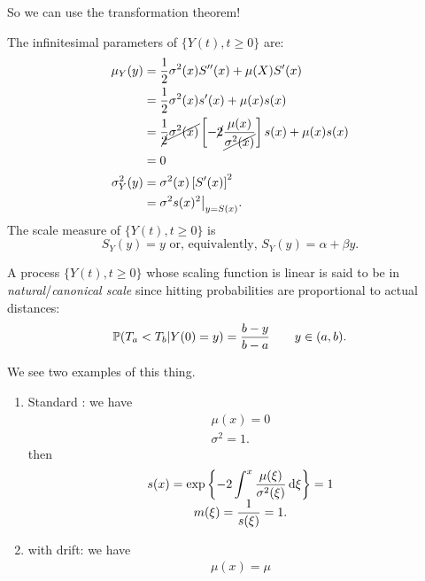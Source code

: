 \documentclass[12pt]{report}
\begin{document}
\begin{enumerate}[\bfseries A:]
\begin{itemize}
		So we can use the transformation theorem!
	\end{itemize}
	The infinitesimal parameters of $\{Y(t),t\geq0\}$ are:
	\begin{align*}
		\mu_{Y}(y)&=\frac{1}{2}\sigma^{2}(x)S''(x)+\mu(X)S'(x)\\
		&=\frac{1}{2}\sigma^{2}(x)s'(x)+\mu(x)s(x)\\
		&=\frac{1}{\cancel{2}}\cancel{\sigma^{2}(x)}\left[-\cancel{2}\frac{\mu(x)}{\cancel{\sigma^{2}(x)}}\right]s(x)+\mu(x)s(x)\\
		&=0\\
		\sigma^{2}_{Y}(y)&=\sigma^{2}(x)\left[S'(x)\right]^{2}\\
		&=\sigma^{2}s(x)^{2}\big|_{y=S(x)}.
	\end{align*}
	The scale measure of $\{Y(t),t\geq0\}$ is
	\begin{equation*}
		S_{Y}(y)=y\text{ or, equivalently, }S_{Y}(y)=\alpha+\beta y.
	\end{equation*}
	\begin{definition}
		A process $\{Y(t),t\geq 0\}$ whose scaling function is linear is said to be in \emph{natural}/\emph{canonical scale} since hitting probabilities are proportional to actual distances:
		\begin{equation*}
			\mathbb{P}(T_{a}<T_{b}|Y(0)=y)=\frac{b-y}{b-a}\qquad y\in(a,b).
		\end{equation*}
	\end{definition}
	We see two examples of this thing.
	\begin{enumerate}[\circlet]
		\item Standard \bwm: we have
		\begin{equation*}
			\begin{array}{c}
				\mu(x)=0\\
				\sigma^{2}=1.
			\end{array}
		\end{equation*}
		then
		\begin{equation*}
			\begin{array}{>{\displaystyle}c}
				s(x)=\expg{-2\int^{x}\frac{\mu(\xi)}{\sigma^{2}(\xi)}\dif\xi}=1\\
			m(\xi)=\frac{1}{s(\xi)}=1.
			\end{array}
		\end{equation*}
		\item \bwm{} with drift: we have
		\begin{equation*}
			\begin{array}{c}
				\mu(x)=\mu\\

\end{array}
\end{equation*}
\end{enumerate}
\end{enumerate}
\end{document}
